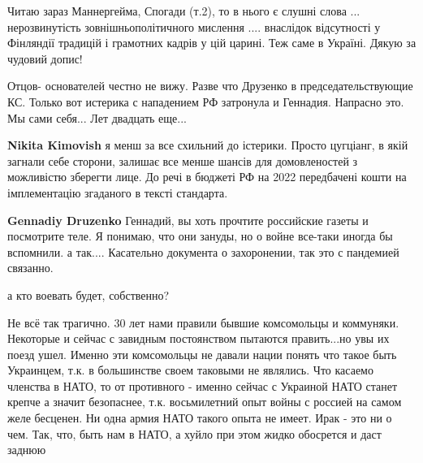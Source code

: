  
 
 
 
 
\zzSecCmt

\begin{itemize} %

Читаю зараз Маннергейма, Спогади (т.2), то в нього є слушні слова ...
нерозвинутість зовнішньополітичного мислення .... внаслідок відсутності у
Фінляндії традицій і грамотних кадрів у цій царині. Теж саме в Україні. Дякую
за чудовий допис!


Отцов- основателей честно не вижу. Разве что Друзенко в председательствующие
КС. Только вот истерика с нападением РФ затронула и Геннадия. Напрасно это. Мы
сами себя... Лет двадцать еще...

\begin{itemize} %
\textbf{Nikita Kimovish} я менш за все схильний до істерики. Просто цугціанг, в якій загнали себе сторони, залишає все менше шансів для домовленостей з можливістю зберегти лице.
До речі в бюджеті РФ на 2022 передбачені кошти на імплементацію згаданого в тексті стандарта.

\textbf{Gennadiy Druzenko} Геннадий, вы хоть прочтите российские газеты и посмотрите теле. Я понимаю, что они зануды, но о войне все-таки иногда бы вспомнили. а так.... Касательно документа о захоронении, так это с пандемией связанно.

а кто воевать будет, собственно?
\end{itemize} %


Не всё так трагично. 30 лет нами правили бывшие комсомольцы и коммуняки.
Некоторые и сейчас с завидным постоянством пытаются править...но увы их поезд
ушел. Именно эти комсомольцы не давали нации понять что такое быть Украинцем,
т.к. в большинстве своем таковыми не являлись. Что касаемо членства в НАТО, то
от противного - именно сейчас с Украиной НАТО станет крепче а значит
безопаснее, т.к. восьмилетний опыт войны с россией на самом желе бесценен. Ни
одна армия НАТО такого опыта не имеет. Ирак - это ни о чем. Так, что, быть нам
в НАТО, а хуйло при этом жидко обосрется и даст заднюю


\end{itemize}
